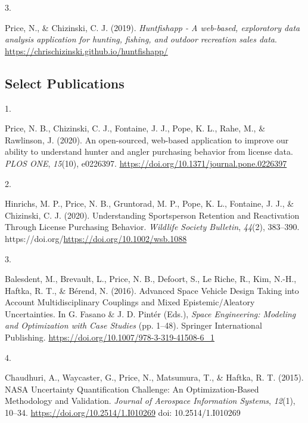 \documentclass[10pt,a4paper,]{article}
\newlength{\cslhangindent}
\newlength{\csllabelwidth}
\newcommand{\CSLBlock}[1]{#1\hfill\break}
\newcommand{\CSLLeftMargin}[1]{\parbox[t]{\csllabelwidth}{\hfill #1~}}
\newcommand{\CSLRightInline}[1]{\parbox[t]{\linewidth - \cslhangindent - \csllabelwidth}{#1}\vspace{0.8ex}}
\begin{document}
\leavevmode{}%
\CSLLeftMargin{3. }%
\CSLRightInline{Price, N., \& Chizinski, C. J. (2019). \emph{Huntfishapp
- A web-based, exploratory data analysis application for hunting,
fishing, and outdoor recreation sales data}.
\url{https://chrischizinski.github.io/huntfishapp/}}

\hypertarget{select-publications}{%
\subsection{Select Publications}\label{select-publications}}

\hypertarget{bibliography}{}
\leavevmode{}%
\CSLLeftMargin{1. }%
\CSLRightInline{Price, N. B., Chizinski, C. J., Fontaine, J. J., Pope,
K. L., Rahe, M., \& Rawlinson, J. (2020). An open-sourced, web-based
application to improve our ability to understand hunter and angler
purchasing behavior from license data. \emph{PLOS ONE}, \emph{15}(10),
e0226397. \url{https://doi.org/10.1371/journal.pone.0226397}}

\leavevmode{}%
\CSLLeftMargin{2. }%
\CSLRightInline{Hinrichs, M. P., Price, N. B., Gruntorad, M. P., Pope,
K. L., Fontaine, J. J., \& Chizinski, C. J. (2020). Understanding
Sportsperson Retention and Reactivation Through License Purchasing
Behavior. \emph{Wildlife Society Bulletin}, \emph{44}(2), 383--390.
https://doi.org/\url{https://doi.org/10.1002/wsb.1088}}

\leavevmode{}%
\CSLLeftMargin{3. }%
\CSLRightInline{Balesdent, M., Brevault, L., Price, N. B., Defoort, S.,
Le Riche, R., Kim, N.-H., Haftka, R. T., \& Bérend, N. (2016). Advanced
Space Vehicle Design Taking into Account Multidisciplinary Couplings and
Mixed Epistemic/Aleatory Uncertainties. In G. Fasano \& J. D. Pintér
(Eds.), \emph{Space Engineering: Modeling and Optimization with Case
Studies} (pp. 1--48). Springer International Publishing.
\url{https://doi.org/10.1007/978-3-319-41508-6_1}}

\leavevmode{}%
\CSLLeftMargin{4. }%
\CSLRightInline{Chaudhuri, A., Waycaster, G., Price, N., Matsumura, T.,
\& Haftka, R. T. (2015). NASA Uncertainty Quantification Challenge: An
Optimization-Based Methodology and Validation. \emph{Journal of
Aerospace Information Systems}, \emph{12}(1), 10--34.
\url{https://doi.org/10.2514/1.I010269}
\CSLBlock{doi: 10.2514/1.I010269}}

\end{document}
